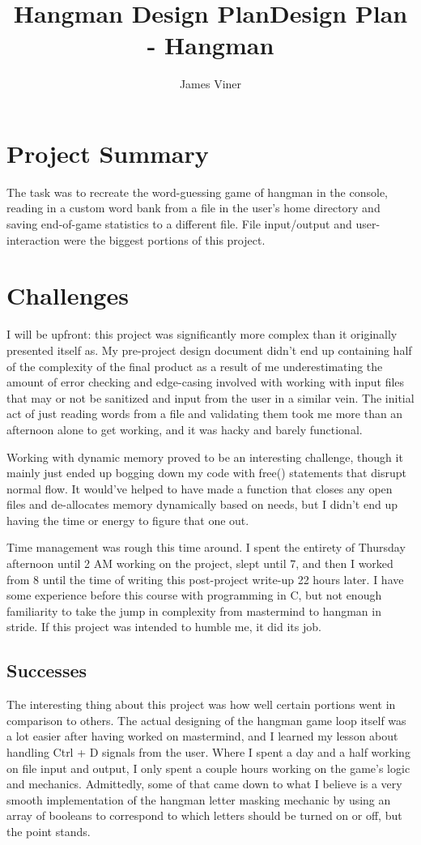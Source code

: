 \documentclass[11pt]{report}
\title{Hangman Design Plan}
\begin{document}
\title{Design Plan - Hangman}
\author{James Viner}
\date{} %

\maketitle

\section*{Project Summary}
The task was to recreate the word-guessing game of hangman in the console, reading in a custom word bank from a file in the user's home directory and saving end-of-game statistics to a different file. File input/output and user-interaction were the biggest portions of this project.
\section*{Challenges}
I will be upfront: this project was significantly more complex than it originally presented itself as. My pre-project design document didn't end up containing half of the complexity of the final product as a result of me underestimating the amount of error checking and edge-casing involved with working with input files that may or not be sanitized and input from the user in a similar vein. The initial act of just reading words from a file and validating them took me more than an afternoon alone to get working, and it was hacky and barely functional.

Working with dynamic memory proved to be an interesting challenge, though it mainly just ended up bogging down my code with free() statements that disrupt normal flow. It would've helped to have made a function that closes any open files and de-allocates memory dynamically based on needs, but I didn't end up having the time or energy to figure that one out.

Time management was rough this time around. I spent the entirety of Thursday afternoon until 2 AM working on the project, slept until 7, and then I worked from 8 until the time of writing this post-project write-up 22 hours later. I have some experience before this course with programming in C, but not enough familiarity to take the jump in complexity from mastermind to hangman in stride. If this project was intended to humble me, it did its job.
\subsection*{Successes}
The interesting thing about this project was how well certain portions went in comparison to others. The actual designing of the hangman game loop itself was a lot easier after having worked on mastermind, and I learned my lesson about handling Ctrl + D signals from the user. Where I spent a day and a half working on file input and output, I only spent a couple hours working on the game's logic and mechanics. Admittedly, some of that came down to what I believe is a very smooth implementation of the hangman letter masking mechanic by using an array of booleans to correspond to which letters should be turned on or off, but the point stands.
\end{document}
